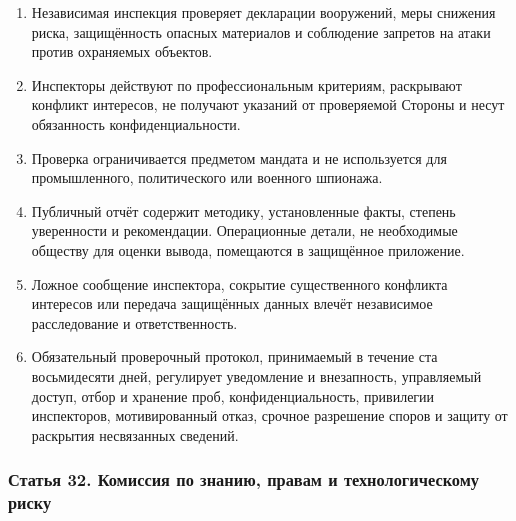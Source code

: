 \documentclass[
  russian,
  11pt,
  a4paper,
]{article}
\providecommand{\tightlist}{%
  \setlength{\itemsep}{0pt}\setlength{\parskip}{0pt}}
\begin{document}
\begin{enumerate}
\def\labelenumi{\arabic{enumi}.}
\tightlist
\item
  Независимая инспекция проверяет декларации вооружений, меры снижения
  риска, защищённость опасных материалов и соблюдение запретов на атаки
  против охраняемых объектов.
\item
  Инспекторы действуют по профессиональным критериям, раскрывают
  конфликт интересов, не получают указаний от проверяемой Стороны и
  несут обязанность конфиденциальности.
\item
  Проверка ограничивается предметом мандата и не используется для
  промышленного, политического или военного шпионажа.
\item
  Публичный отчёт содержит методику, установленные факты, степень
  уверенности и рекомендации. Операционные детали, не необходимые
  обществу для оценки вывода, помещаются в защищённое приложение.
\item
  Ложное сообщение инспектора, сокрытие существенного конфликта
  интересов или передача защищённых данных влечёт независимое
  расследование и ответственность.
\item
  Обязательный проверочный протокол, принимаемый в течение ста
  восьмидесяти дней, регулирует уведомление и внезапность, управляемый
  доступ, отбор и хранение проб, конфиденциальность, привилегии
  инспекторов, мотивированный отказ, срочное разрешение споров и защиту
  от раскрытия несвязанных сведений.
\end{enumerate}

\subsubsection{Статья 32. Комиссия по знанию, правам и технологическому
риску}\label{ux441ux442ux430ux442ux44cux44f-32-ux43aux43eux43cux438ux441ux441ux438ux44f-ux43fux43e-ux437ux43dux430ux43dux438ux44e-ux43fux440ux430ux432ux430ux43c-ux438-ux442ux435ux445ux43dux43eux43bux43eux433ux438ux447ux435ux441ux43aux43eux43cux443-ux440ux438ux441ux43aux443}
\end{document}
